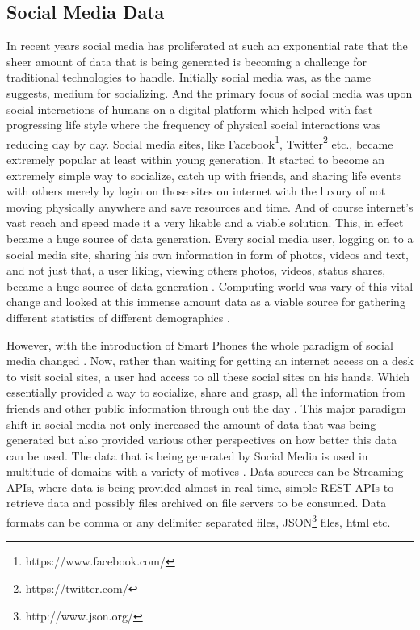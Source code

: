 \documentclass[sigconf]{acmart}
\begin{document}
\subsection{Social Media Data}

In recent years social media has proliferated at such an exponential rate that the sheer amount of data that is being generated is becoming a challenge for traditional technologies to handle. Initially social media was, as the name suggests, medium for socializing. And the primary focus of social media was upon social interactions of humans on a digital platform which helped with fast progressing life style where the frequency of physical social interactions was reducing day by day. Social media sites, like Facebook\footnote{https://www.facebook.com/}, Twitter\footnote{https://twitter.com/} etc., became extremely popular at least within young generation. It started to become an extremely simple way to socialize, catch up with friends, and sharing life events with others merely by login on those sites on internet with the luxury of not moving physically anywhere and save resources and time. And of course internet's vast reach and speed made it a very likable and a viable solution. This, in effect became a huge source of data generation. Every social media user, logging on to a social media site, sharing his own information in form of photos, videos and text, and not just that, a user liking, viewing others photos, videos, status shares, became a huge source of data generation \cite{fbstats}. Computing world was vary of this vital change and looked at this immense amount data as a viable source for gathering different statistics of different demographics \cite{bogdanphilip}.

However, with the introduction of Smart Phones the whole paradigm of social media changed \cite{CIER}. Now, rather than waiting for getting an internet access on a desk to visit social sites, a user had access to all these social sites on his hands. Which essentially provided a way to socialize, share and grasp, all the information from friends and other public information through out the day \cite{amandaphones}. This major paradigm shift in social media not only increased the amount of data that was being generated but also provided various other perspectives on how better this data can be used. The data that is being generated by Social Media is used in multitude of domains with a variety of motives \cite{ncsupost}. Data sources can be Streaming APIs, where data is being provided almost in real time, simple REST APIs to retrieve data and possibly files archived on file servers to be consumed. Data formats can be comma or any delimiter separated files, JSON\footnote{http://www.json.org/} files, html etc.
\end{document}
